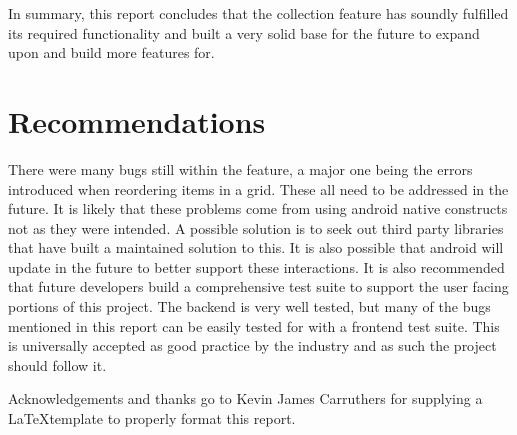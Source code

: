 \documentclass[12pt]{article}
\begin{document}
In summary, this report concludes that the collection feature has soundly fulfilled its required functionality and built a very solid base for the future to expand upon and build more features for. 

\section{Recommendations}
There were many bugs still within the feature, a major one being the errors introduced when reordering items in a grid. These all need to be addressed in the future. It is likely that these problems come from using android native constructs not as they were intended. A possible solution is to seek out third party libraries that have built a maintained solution to this. It is also possible that android will update in the future to better support these interactions. It is also recommended that future developers build a comprehensive test suite to support the user facing portions of this project. The backend is very well tested, but many of the bugs mentioned in this report can be easily tested for with a frontend test suite. This is universally accepted as good practice by the industry and as such the project should follow it.



	Acknowledgements and thanks go to Kevin James Carruthers for supplying a \LaTeX template to properly format this report.
\newpage



\newpage
\end{document}
